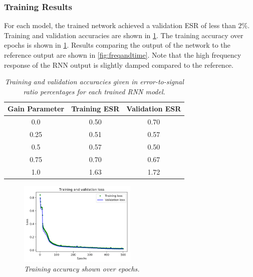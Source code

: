 \documentclass[twoside,a4paper]{article}
\begin{document}
\subsubsection{Training Results}
For each model, the trained network achieved a validation ESR of less than
$2\%$. Training and validation accuracies are shown in \cref{table:train}.
The training accuracy over epochs is shown in \cref{fig:training}. Results
comparing the output of the network to the reference output are shown in
\cref{fig:freqandtime}. Note that the high frequency response of the RNN
output is slightly damped compared to the reference.
%
\begin{table}[h!]
    \centering
     \begin{tabular}{||c | c | c||} 
     \hline
     Gain Parameter & Training ESR & Validation ESR \\
     \hline\hline
     0.0  & 0.50 & 0.70 \\
     0.25 & 0.51 & 0.57 \\
     0.5  & 0.57 & 0.50 \\
     0.75 & 0.70 & 0.67 \\
     1.0  & 1.63 & 1.72 \\
     \hline
     \end{tabular}
    \caption{\label{table:train} {\it Training and validation
        accuracies given in error-to-signal ratio percentages
        for each trained RNN model.}}
\end{table}
%
\begin{figure}
    \centering
    \includegraphics[width=0.5\textwidth]{Training.png}
    \caption{\label{fig:training} {\it Training accuracy
        shown over epochs.}}
\end{figure}
%
\end{document}
